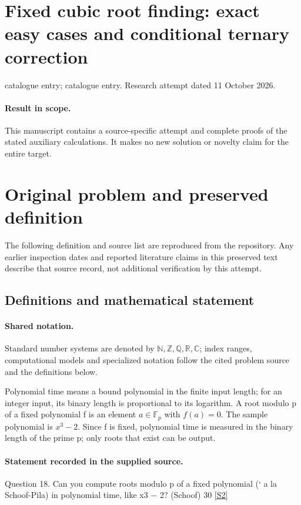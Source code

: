\documentclass[11pt]{article}
\begin{document}
\section*{Fixed cubic root finding: exact easy cases and conditional ternary correction}
\noindent catalogue entry; catalogue entry. Research attempt dated 11 October 2026.
\paragraph{Result in scope.}This manuscript contains a source-specific attempt and complete proofs of the stated auxiliary calculations. It makes no new solution or novelty claim for the entire target.
\section{Original problem and preserved definition}
The following definition and source list are reproduced from the repository. Any earlier inspection dates and reported literature claims in this preserved text describe that source record, not additional verification by this attempt.
\subsection{Definitions and mathematical statement}

\paragraph{Shared notation.}Standard number systems are denoted by $\mathbb N,\mathbb Z,\mathbb Q,\mathbb R,\mathbb C$; index ranges, computational models and specialized notation follow the cited problem source and the definitions below.


Polynomial time means a bound polynomial in the finite input length; for an integer input, its binary length is proportional to its logarithm. A root modulo p of a fixed polynomial f is an element $a\in\mathbb F_p$ with $f(a)=0$. The sample polynomial is $x^3-2$. Since f is fixed, polynomial time is measured in the binary length of the prime p; only roots that exist can be output.
\paragraph{Statement recorded in the supplied source.}
Question 18. Can you compute roots modulo p of a fixed polynomial (` a la Schoof-Pila) in polynomial time, like x3 − 2? (Schoof) 30 \href{https://aimath.org/WWN/primesinp/primesinp.pdf}{[S2]}
\end{document}
